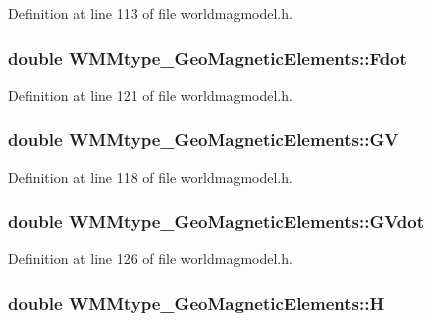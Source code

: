 \-Definition at line 113 of file worldmagmodel.\-h.

\hypertarget{struct_w_m_mtype___geo_magnetic_elements_a9a1465364de801ea9a6567f63aeddff7}{
\subsubsection[{\-Fdot}]{\setlength{\rightskip}{0pt plus 5cm}double {\bf \-W\-M\-Mtype\-\_\-\-Geo\-Magnetic\-Elements\-::\-Fdot}}}\label{struct_w_m_mtype___geo_magnetic_elements_a9a1465364de801ea9a6567f63aeddff7}


\-Definition at line 121 of file worldmagmodel.\-h.

\hypertarget{struct_w_m_mtype___geo_magnetic_elements_a384032e354879712c50bee2ffef663c2}{
\subsubsection[{\-G\-V}]{\setlength{\rightskip}{0pt plus 5cm}double {\bf \-W\-M\-Mtype\-\_\-\-Geo\-Magnetic\-Elements\-::\-G\-V}}}\label{struct_w_m_mtype___geo_magnetic_elements_a384032e354879712c50bee2ffef663c2}


\-Definition at line 118 of file worldmagmodel.\-h.

\hypertarget{struct_w_m_mtype___geo_magnetic_elements_abd5895b4add30e1d0a36e0b86ab9af22}{
\subsubsection[{\-G\-Vdot}]{\setlength{\rightskip}{0pt plus 5cm}double {\bf \-W\-M\-Mtype\-\_\-\-Geo\-Magnetic\-Elements\-::\-G\-Vdot}}}\label{struct_w_m_mtype___geo_magnetic_elements_abd5895b4add30e1d0a36e0b86ab9af22}


\-Definition at line 126 of file worldmagmodel.\-h.

\hypertarget{struct_w_m_mtype___geo_magnetic_elements_a0481f463d3ac0e7d7638edd1293955ed}{
\subsubsection[{\-H}]{\setlength{\rightskip}{0pt plus 5cm}double {\bf \-W\-M\-Mtype\-\_\-\-Geo\-Magnetic\-Elements\-::\-H}}}\label{struct_w_m_mtype___geo_magnetic_elements_a0481f463d3ac0e7d7638edd1293955ed}


